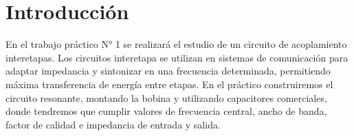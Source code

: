 \section{Introducción}

En el trabajo práctico N° 1 se realizará el estudio de un circuito de acoplamiento interetapas.
Los circuitos interetapa se utilizan en sistemas de comunicación para adaptar impedancia y sintonizar en una frecuencia determinada,
 permitiendo máxima transferencia de energía entre etapas. En el práctico construiremos el circuito resonante, montando la bobina y
 utilizando capacitores comerciales, donde tendremos que cumplir valores de frecuencia central, ancho de banda, factor de calidad e 
 impedancia de entrada y salida.

